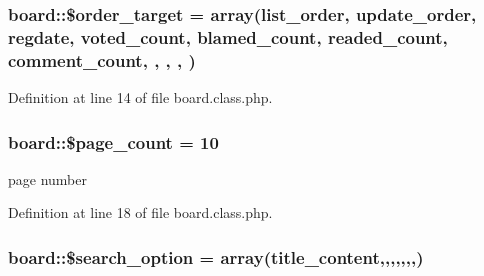 \subsubsection[{\$order\+\_\+target}]{\setlength{\rightskip}{0pt plus 5cm}board\+::\$order\+\_\+target = array(\textquotesingle{}list\+\_\+order\textquotesingle{}, \textquotesingle{}update\+\_\+order\textquotesingle{}, \textquotesingle{}regdate\textquotesingle{}, \textquotesingle{}voted\+\_\+count\textquotesingle{}, \textquotesingle{}blamed\+\_\+count\textquotesingle{}, \textquotesingle{}readed\+\_\+count\textquotesingle{}, \textquotesingle{}comment\+\_\+count\textquotesingle{}, \textquotesingle{}, \textquotesingle{}, \textquotesingle{}, \textquotesingle{})}\label{classboard_a66d1965fe6a51e8143499adeaf3998cc}


Definition at line 14 of file board.\+class.\+php.

\hypertarget{classboard_ab5d2d3925f753039483da2c65076122b}{}
\subsubsection[{\$page\+\_\+count}]{\setlength{\rightskip}{0pt plus 5cm}board\+::\$page\+\_\+count = 10}\label{classboard_ab5d2d3925f753039483da2c65076122b}


page number 



Definition at line 18 of file board.\+class.\+php.

\hypertarget{classboard_a6affe0c86966ebd06572cc4c8abde32b}{}
\subsubsection[{\$search\+\_\+option}]{\setlength{\rightskip}{0pt plus 5cm}board\+::\$search\+\_\+option = array(\textquotesingle{}title\+\_\+content\textquotesingle{},\textquotesingle{},\textquotesingle{},\textquotesingle{},\textquotesingle{},\textquotesingle{},\textquotesingle{},\textquotesingle{})}\label{classboard_a6affe0c86966ebd06572cc4c8abde32b}


